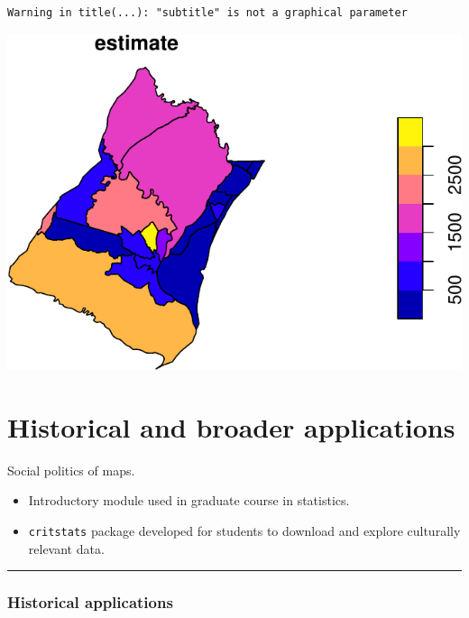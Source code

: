 \documentclass[
  letterpaper,
  DIV=11,
  numbers=noendperiod]{scrartcl}
\begin{document}
\begin{verbatim}
Warning in title(...): "subtitle" is not a graphical parameter
\end{verbatim}

\includegraphics{talk_files/figure-pdf/unnamed-chunk-3-1.pdf}

\hypertarget{historical-and-broader-applications}{%
\section{Historical and broader
applications}\label{historical-and-broader-applications}}

Social politics of maps.

\begin{itemize}
\item
  Introductory module used in graduate course in statistics.
\item
  \texttt{critstats} package developed for students to download and
  explore culturally relevant data.
\end{itemize}

\begin{center}\rule{0.5\linewidth}{0.5pt}\end{center}

\hypertarget{historical-applications}{%
\subsubsection{Historical applications}\label{historical-applications}}
\end{document}

